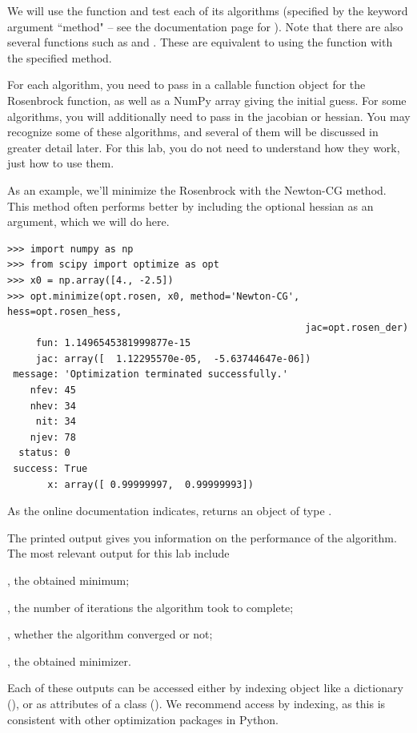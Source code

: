 We will use the  function and test each of its algorithms (specified by the keyword argument ``method" -- see the documentation page for ).
Note that there are also several functions such as  and . These are equivalent to using the  function with the specified method.

For each algorithm, you need to pass in a callable function object for the Rosenbrock function, as well as a NumPy array giving the initial guess.
For some algorithms, you will additionally need to pass in the jacobian or hessian.
You may recognize some of these algorithms, and several of them will be discussed in greater detail later. For this lab, you do not need to understand how they work, just
how to use them.

As an example, we'll minimize the Rosenbrock with the Newton-CG method. 
This method often performs better by including the optional hessian as an argument, which we will do here.
\begin{lstlisting}
>>> import numpy as np
>>> from scipy import optimize as opt
>>> x0 = np.array([4., -2.5])
>>> opt.minimize(opt.rosen, x0, method='Newton-CG', hess=opt.rosen_hess, 
													jac=opt.rosen_der)
     fun: 1.1496545381999877e-15
     jac: array([  1.12295570e-05,  -5.63744647e-06])
 message: 'Optimization terminated successfully.'
    nfev: 45
    nhev: 34
     nit: 34
    njev: 78
  status: 0
 success: True
       x: array([ 0.99999997,  0.99999993])
\end{lstlisting}
As the online documentation indicates,  returns an object of type . 

The printed output gives you information on the performance of the algorithm. 
The most relevant output for this lab include 

, the obtained minimum; 

, the number of iterations the algorithm took to complete; 

, whether the algorithm converged or not; 

, the obtained minimizer.

Each of these outputs can be accessed either by indexing  object like a dictionary (), or as attributes of a class ().  
We recommend access by indexing, as this is consistent with other optimization packages in Python.

